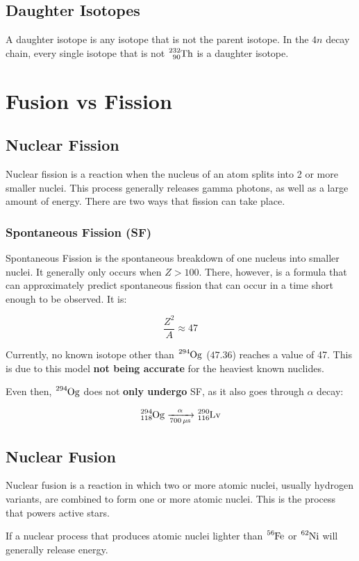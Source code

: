 \documentclass{article}
\begin{document}
\begin{multicols*}{2}
    \subsection{Daughter Isotopes}
    A daughter isotope is any isotope that is not the parent isotope. In the $4n$ decay
    chain, every single isotope that is not $\ce{^{232}_{90}Th}$ is a daughter isotope. 


    \section{Fusion vs Fission}
    \subsection{Nuclear Fission}
    Nuclear fission is a reaction when the nucleus of an atom splits into 2
    or more smaller nuclei. This process generally releases gamma photons,
    as well as a large amount of energy. There are two ways that fission can
    take place.

    \subsubsection{Spontaneous Fission (SF)}
    Spontaneous Fission is the spontaneous breakdown of one nucleus into
    smaller nuclei. It generally only occurs when $Z > 100$. There, however,
    is a formula that can approximately predict spontaneous fission that can
    occur in a time short enough to be observed. It is:

    \[
      \frac{Z^2}{A} \approx 47
    \]

    Currently, no known isotope other than $\ce{^{294}Og}$ ($47.36$)
    reaches a value of 47. This is due to this model \textbf{not being accurate}
    for the heaviest known nuclides.

    Even then, $\ce{^{294}Og}$ does not \textbf{only undergo} SF, as it also
    goes through $\alpha$ decay:

    \[
      \ce{^{294}_{118}Og ->[\alpha][700 \mu{s}] ^{290}_{116}Lv}
    \]
    \subsection{Nuclear Fusion}
    Nuclear fusion is a reaction in which two or more atomic nuclei, usually
    hydrogen variants, are combined to form one or more atomic nuclei. This
    is the process that powers active stars.

    If a nuclear process that produces atomic nuclei lighter than $\ce{^{56}Fe}$
    or $\ce{^{62}Ni}$ will generally release energy.


\end{multicols*}
\end{document}
